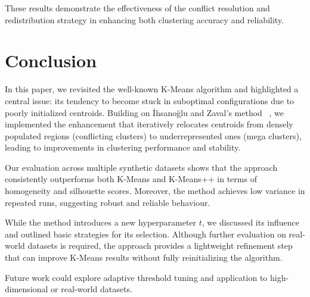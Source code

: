 \documentclass[10pt,twocolumn,letterpaper]{article}
\begin{document}
These results demonstrate the effectiveness of the conflict resolution and
redistribution strategy in enhancing both clustering accuracy and reliability.


\section{Conclusion}\label{sec:conclusion}

In this paper, we revisited the well-known K-Means algorithm and highlighted a
central issue: its tendency to become stuck in suboptimal configurations due to
poorly initialized centroids. Building on İhsanoğlu and Zaval’s method
~\cite{Abdullah10601123}, we implemented the enhancement that iteratively
relocates centroids from densely populated regions (conflicting clusters) to
underrepresented ones (mega clusters), leading to improvements in clustering
performance and stability.

Our evaluation across multiple synthetic datasets shows that the approach
consistently outperforms both K-Means and K-Means++ in terms of homogeneity and
silhouette scores. Moreover, the method achieves low variance in repeated runs,
suggesting robust and reliable behaviour.

While the method introduces a new hyperparameter $t$, we discussed its
influence and outlined basic strategies for its selection. Although further
evaluation on real-world datasets is required, the approach provides a
lightweight refinement step that can improve K-Means results without fully
reinitializing the algorithm.

Future work could explore adaptive threshold tuning and application to
high-dimensional or real-world datasets.



    {\small
        
        
    }
\end{document}
